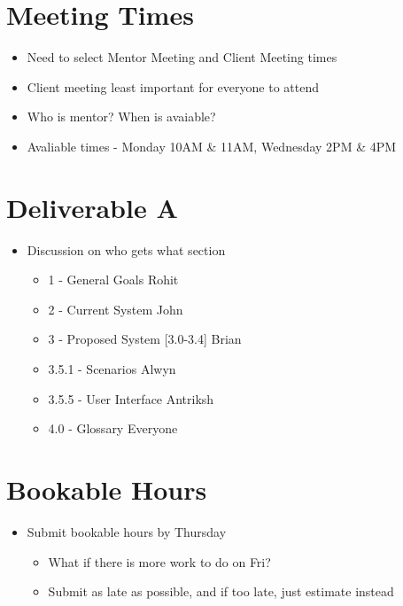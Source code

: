 
\date{8th August, 2011}
\absent{-}


\maketitle{}


\section{Meeting Times}
\begin{itemize}
\item Need to select Mentor Meeting and Client Meeting times
\item Client meeting least important for everyone to attend
\item Who is mentor? When is avaiable?
\item Avaliable times - Monday 10AM \& 11AM, Wednesday 2PM \& 4PM
\end{itemize}

\section{Deliverable A}
\begin{itemize}
\item Discussion on who gets what section
 \begin{itemize}
 \item 1 - General Goals
 \actioned Rohit
 \item 2 - Current System
 \actioned John
 \item 3 - Proposed System [3.0-3.4]
 \actioned Brian
 \item 3.5.1 - Scenarios
 \actioned Alwyn
 \item 3.5.5 - User Interface
 \actioned Antriksh
 \item 4.0 - Glossary
 \actioned Everyone
 \end{itemize}
\end{itemize}

\section{Bookable Hours}
\begin{itemize}
\item Submit bookable hours by Thursday
 \begin{itemize}
 \item What if there is more work to do on Fri?
 \item Submit as late as possible, and if too late, just estimate instead
 \end{itemize}
\end{itemize}

